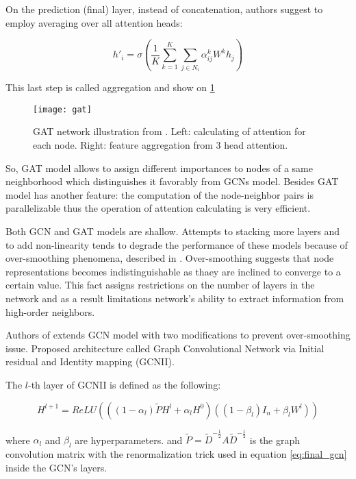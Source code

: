 On the prediction (final) layer, instead of concatenation, authors suggest to employ averaging over all attention heads:

\begin{equation}
    h'_i =  \sigma \left( \frac{1}{K} \sum_{k=1}^{K} \sum_{j \in {N_i}} \alpha^{k}_{ij} W^{k} h_j \right)
    \label{eq:multihead2}
\end{equation}


This last step is called aggregation and show on \ref{fig:gat}

\begin{figure}[t]
    \centering
    \texttt{[image: gat]}
    \caption{GAT network illustration from \cite{GAT}. Left: calculating of attention for each node. Right: feature aggregation from 3 head attention.}
    \label{fig:gat}
\end{figure}


So, GAT model allows to assign different importances to nodes of a same neighborhood which distinguishes it favorably from GCNs
model. Besides GAT model has another feature: the computation of the node-neighbor pairs is parallelizable thus the operation
of attention calculating is very efficient.


Both GCN\cite{GCN} and GAT\cite{GAT} models are shallow. Attempts to stacking more layers and to add non-linearity
tends to degrade the performance of these models \cite{GCNII} because of over-smoothing phenomena, described in \cite{OverSmoothing}.
Over-smoothing suggests that node representations becomes indistinguishable as thaey are inclined to converge 
to a certain value. This fact assigns restrictions on the number of layers in the network and as a result
limitations network's ability to extract information from high-order neighbors.


Authors of \cite{GCNII} extends GCN model with two modifications to prevent over-smoothing issue. Proposed architecture 
called Graph Convolutional Network via Initial residual and Identity mapping (GCNII).

The $l$-th layer of GCNII is defined as the following:

\begin{equation}
    H^{l+1} = ReLU\left( ((1-\alpha_{l})\tilde{P}H^{l} + \alpha_{l}H^{0}) ((1-\beta_{l})I_n + \beta_{l} W^{l})  \right)
    \label{eq:gcnii_layer}
\end{equation}

where $\alpha_l$ and $\beta_l$ are hyperparameters.
and $\tilde{P} = \tilde{D}^{-\frac{1}{2}}A\tilde{D}^{-\frac{1}{2}}$ is the graph 
convolution matrix with the renormalization trick used in equation \ref{eq:final_gcn} inside the GCN's layers.


